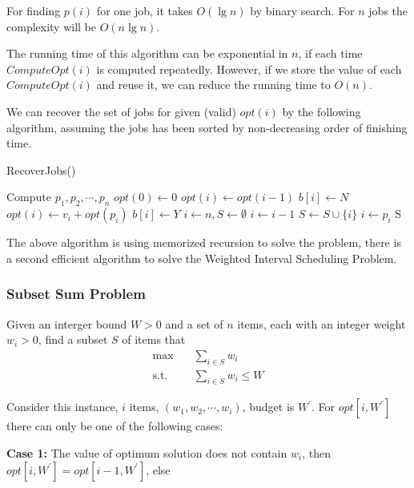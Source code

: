 					For finding $p(i)$ for one job, it takes $O(\lg n)$ by binary search. For $n$ jobs the complexity will be $O(n\lg n)$.

					The running time of this algorithm can be exponential in $n$, if each time $ComputeOpt(i)$ is computed repeatedly. However, if we store the value of each $ComputeOpt(i)$ and reuse it, we can reduce the running time to $O(n)$.

					We can recover the set of jobs for given (valid) $opt(i)$ by the following algorithm, assuming the jobs has been sorted by non-decreasing order of finishing time.
					\begin{algorithm}[h]
						\caption{RecoverJobs()}
						\begin{algorithmic}[1]
							\State Compute $p_1, p_2, \cdots, p_n$
							\State $opt(0) \gets 0$
									\State $opt(i) \gets opt(i - 1)$
									\State $b[i] \gets N$								
								\Else
									\State $opt(i) \gets v_i + opt(p_i)$
									\State $b[i] \gets Y$
								\EndIf
							\EndFor
							\State $i \gets n, S\gets \emptyset$
							\While {$i \ne 0$}
								\If {$b[i] == N$}
									\State $i \gets i - 1$
								\Else
									\State $S \gets S \cup \{i\}$
									\State $i \gets p_i$
								\EndIf
							\EndWhile
							\State \Return S
						\end{algorithmic}
					\end{algorithm}

					The above algorithm is using memorized recursion to solve the problem, there is a second efficient algorithm to solve the Weighted Interval Scheduling Problem.

				\subsubsection{Subset Sum Problem}
					Given an interger bound $W > 0$ and a set of $n$ items, each with an integer weight $w_i > 0$, find a subset $S$ of items that
					\begin{align}
						\max \quad &\sum_{i \in S} w_i\\
						\text{s.t.} \quad & \sum_{i \in S} w_i \le W
					\end{align}

					Consider this instance, $i$ items, $(w_1, w_2, \cdots, w_i)$, budget is $W^\prime$. For $opt[i, W^\prime]$ there can only be one of the following cases:

					\textbf{Case 1: }The value of optimum solution does not contain $w_i$, then $opt[i, W^\prime] = opt[i - 1, W^\prime]$, else

